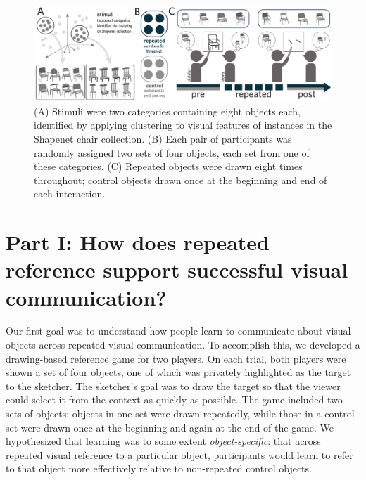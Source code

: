 \documentclass[10pt,letterpaper]{article}
\begin{document}
\begin{figure}
\includegraphics[width=\linewidth]{figures/task_stimuli.pdf}
\caption{(A) Stimuli were two categories containing eight objects each, identified by applying clustering to visual features of instances in the Shapenet chair collection. (B) Each pair of participants was randomly assigned two sets of four objects, each set from one of these categories. (C) Repeated objects were drawn eight times throughout; control objects drawn once at the beginning and end of each interaction.} 
\label{task_stimuli}
\end{figure}

\section{Part I: How does repeated reference support successful visual communication?}

Our first goal was to understand how people learn to communicate about visual objects across repeated visual communication. 
To accomplish this, we developed a drawing-based reference game for two players. 
On each trial, both players were shown a set of four objects, one of which was privately highlighted as the target to the sketcher. 
The sketcher's goal was to draw the target so that the viewer could select it from the context as quickly as possible. 
The game included two sets of objects: objects in one set were drawn repeatedly, while those in a control set were drawn once at the beginning and again at the end of the game.
We hypothesized that learning was to some extent \emph{object-specific}: that across repeated visual reference to a particular object, participants would learn to refer to that object more effectively relative to non-repeated control objects. 

\end{document}

